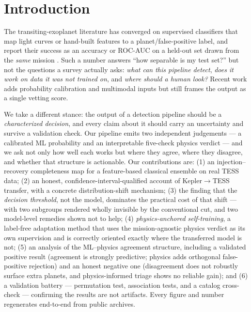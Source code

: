 \documentclass[11pt]{article}
\begin{document}
\section{Introduction}
The transiting-exoplanet literature has converged on supervised classifiers that
map light curves or hand-built features to a planet/false-positive label, and
report their success as an accuracy or ROC-AUC on a held-out set drawn from the
\emph{same} mission \cite{shallue2018,exominer2021}. Such a number answers
``how separable is my test set?'' but not the questions a survey actually asks:
\emph{what can this pipeline detect}, \emph{does it work on data it was not
trained on}, and \emph{where should a human look?} Recent work adds probability
calibration and multimodal inputs \cite{exonet2026} but still frames the output
as a single vetting score.

We take a different stance: the output of a detection pipeline should be a
\emph{characterized decision}, and every claim about it should carry an
uncertainty and survive a validation check. Our pipeline emits two independent
judgements --- a calibrated ML probability and an interpretable five-check physics
verdict --- and we ask not only how well each works but where they agree, where
they disagree, and whether that structure is actionable. Our contributions are:
(1) an injection--recovery completeness map for a feature-based classical ensemble
on real TESS data; (2) an honest, confidence-interval-qualified account of
Kepler$\rightarrow$TESS transfer, with a concrete distribution-shift mechanism;
(3) the finding that the \emph{decision threshold}, not the model, dominates the
practical cost of that shift --- with two subgroups rendered wholly invisible by
the conventional cut, and two model-level remedies shown not to help;
(4) \emph{physics-anchored self-training}, a label-free adaptation method that
uses the mission-agnostic physics verdict as its own supervision and is
correctly oriented exactly where the transferred model is not;
(5) an analysis of the ML--physics agreement structure, including a validated
positive result (agreement is strongly predictive; physics adds orthogonal
false-positive rejection) and an honest negative one (disagreement does not
robustly surface extra planets, and physics-informed triage shows no reliable
gain); and (6) a validation battery --- permutation test, association tests, and a
catalog cross-check --- confirming the results are not artifacts. Every figure
and number regenerates end-to-end from public archives.
\end{document}
